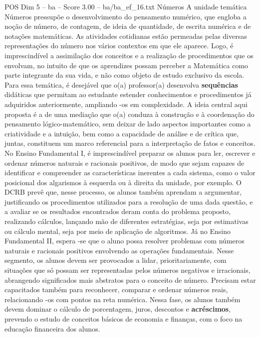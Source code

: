 \begin{textsample}{POS Dim 5 – ba – Score 3.00 – ba/ba\_ef\_16.txt}  \label{ex:f5_pos_280}
Números A unidade temática Números pressupõe o desenvolvimento do pensamento numérico, que engloba a noção de número, de contagem, de ideia de quantidade, de escrita numérica e de notações matemáticas.
As atividades cotidianas estão permeadas pelas diversas representações do número nos vários contextos em que ele aparece.
Logo, é imprescindível a assimilação dos conceitos e a realização de procedimentos que os envolvam, no intuito de que os aprendizes possam perceber a Matemática como parte integrante da sua vida, e não como objeto de estudo exclusivo da escola.
Para essa temática, é desejável que o(a) professor(a) desenvolva \textbf{sequências} didáticas que permitam ao estudante estender conhecimentos e procedimentos já adquiridos anteriormente, ampliando -os em complexidade.
A ideia central aqui proposta é a de uma mediação que o(a) conduza à construção e à coordenação do pensamento lógico-matemático, sem deixar de lado aspectos importantes como a criatividade e a intuição, bem como a capacidade de análise e de crítica que, juntas, constituem um marco referencial para a interpretação de fatos e conceitos.
No Ensino Fundamental I, é imprescindível preparar os alunos para ler, escrever e ordenar números naturais e racionais positivos, de modo que sejam capazes de identificar e compreender as características inerentes a cada sistema, como o valor posicional dos algarismos à esquerda ou à direita da unidade, por exemplo.
O DCRB prevê que, nesse processo, os alunos também aprendam a argumentar, justificando os procedimentos utilizados para a resolução de uma dada questão, e a avaliar se os resultados encontrados deram conta do problema proposto, realizando cálculos, lançando mão de diferentes estratégias, seja por estimativas ou cálculo mental, seja por meio de aplicação de algoritmos.
Já no Ensino Fundamental II, espera -se que o aluno possa resolver problemas com números naturais e racionais positivos envolvendo as operações fundamentais.
Nesse segmento, os alunos devem ser provocados a lidar, prioritariamente, com situações que só possam ser representadas pelos números negativos e irracionais, abrangendo significados mais abstratos para o conceito de número.
Precisam estar capacitados também para reconhecer, comparar e ordenar números reais, relacionando -os com pontos na reta numérica.
Nessa fase, os alunos também devem dominar o cálculo de porcentagem, juros, descontos e \textbf{acréscimos}, prevendo o estudo de conceitos básicos de economia e finanças, com o foco na educação financeira dos alunos.

\end{textsample}
